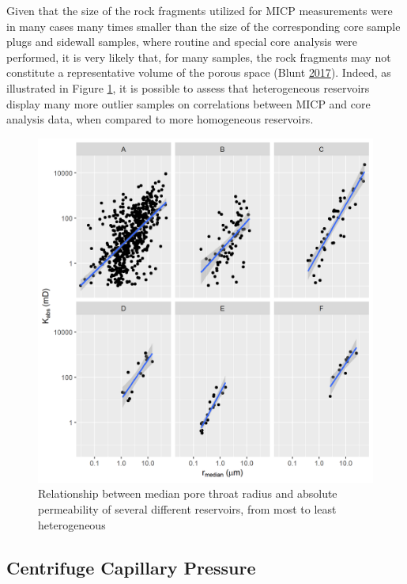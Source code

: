 \documentclass[english,msc,numbers]{coppe}
\begin{document}
  Given that the size of the rock fragments utilized for MICP measurements were in many cases many times smaller than the size of the corresponding core sample plugs and sidewall samples, where routine and special core analysis were performed, it is very likely that, for many samples, the rock fragments may not constitute a representative volume of the porous space (Blunt \protect\hyperlink{ref-Blunt2017}{2017}). Indeed, as illustrated in Figure \ref{fig:heterogeneity}, it is possible to assess that heterogeneous reservoirs display many more outlier samples on correlations between MICP and core analysis data, when compared to more homogeneous reservoirs.
  \begin{figure}
  
  {\centering \includegraphics[width=0.85\linewidth]{figure/2-6-heterogeneity} 
  
  }
  
  \caption{Relationship between median pore throat radius and absolute permeability of several different reservoirs, from most to least heterogeneous}\label{fig:heterogeneity}
  \end{figure}
  \hypertarget{centrifuge-capillary-pressure}{%
  \subsection{Centrifuge Capillary Pressure}\label{centrifuge-capillary-pressure}}
  
\end{document}
